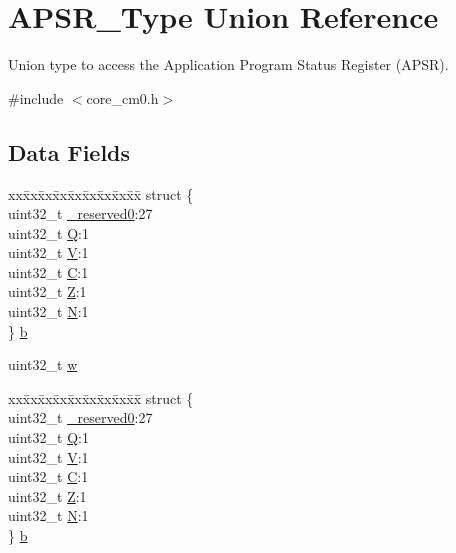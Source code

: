 \hypertarget{union_a_p_s_r___type}{\section{A\-P\-S\-R\-\_\-\-Type Union Reference}
\label{union_a_p_s_r___type}
}


Union type to access the Application Program Status Register (A\-P\-S\-R).  




{\ttfamily \#include $<$core\-\_\-cm0.\-h$>$}

\subsection*{Data Fields}
\begin{DoxyCompactItemize}
\item 
\begin{tabbing}
xx\=xx\=xx\=xx\=xx\=xx\=xx\=xx\=xx\=\kill
struct \{\\
\>uint32\_t \hyperlink{union_a_p_s_r___type_ac8a6a13838a897c8d0b8bc991bbaf7c1}{\_reserved0}:27\\
\>uint32\_t \hyperlink{union_a_p_s_r___type_a65f27ddc4f7e09c14ce7c5211b2e000a}{Q}:1\\
\>uint32\_t \hyperlink{union_a_p_s_r___type_acd4a2b64faee91e4a9eef300667fa222}{V}:1\\
\>uint32\_t \hyperlink{union_a_p_s_r___type_a7a1caf92f32fe9ebd8d1fe89b06c7776}{C}:1\\
\>uint32\_t \hyperlink{union_a_p_s_r___type_a5ae954cbd9986cd64625d7fa00943c8e}{Z}:1\\
\>uint32\_t \hyperlink{union_a_p_s_r___type_abae0610bc2a97bbf7f689e953e0b451f}{N}:1\\
\} \hyperlink{union_a_p_s_r___type_a2e5b85cff450c7f92c7388dd09f10065}{b}\\

\end{tabbing}\item 
uint32\-\_\-t \hyperlink{union_a_p_s_r___type_ad0fb62e7a08e70fc5e0a76b67809f84b}{w}
\item 
\begin{tabbing}
xx\=xx\=xx\=xx\=xx\=xx\=xx\=xx\=xx\=\kill
struct \{\\
\>uint32\_t \hyperlink{union_a_p_s_r___type_ac8a6a13838a897c8d0b8bc991bbaf7c1}{\_reserved0}:27\\
\>uint32\_t \hyperlink{union_a_p_s_r___type_a65f27ddc4f7e09c14ce7c5211b2e000a}{Q}:1\\
\>uint32\_t \hyperlink{union_a_p_s_r___type_acd4a2b64faee91e4a9eef300667fa222}{V}:1\\
\>uint32\_t \hyperlink{union_a_p_s_r___type_a7a1caf92f32fe9ebd8d1fe89b06c7776}{C}:1\\
\>uint32\_t \hyperlink{union_a_p_s_r___type_a5ae954cbd9986cd64625d7fa00943c8e}{Z}:1\\
\>uint32\_t \hyperlink{union_a_p_s_r___type_abae0610bc2a97bbf7f689e953e0b451f}{N}:1\\
\} \hyperlink{union_a_p_s_r___type_a398a87eafed8dea4e666d03278e69b74}{b}\\


\end{tabbing}
\end{DoxyCompactItemize}
